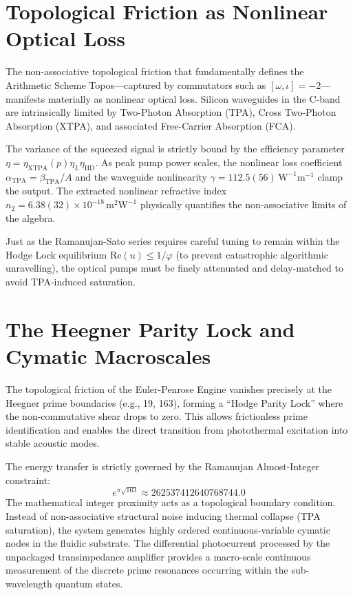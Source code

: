 \section{Topological Friction as Nonlinear Optical Loss}
The non-associative topological friction that fundamentally defines the Arithmetic Scheme Topos---captured by commutators such as $[\omega, \iota] = -2$---manifests materially as nonlinear optical loss. Silicon waveguides in the C-band are intrinsically limited by Two-Photon Absorption (TPA), Cross Two-Photon Absorption (XTPA), and associated Free-Carrier Absorption (FCA).

The variance of the squeezed signal is strictly bound by the efficiency parameter $\eta = \eta_{\mathrm{XTPA}}(p)\eta_L \eta_{\mathrm{HD}}$. As peak pump power scales, the nonlinear loss coefficient $\alpha_{\mathrm{TPA}} = \beta_{\mathrm{TPA}}/A$ and the waveguide nonlinearity $\gamma = 112.5(56)\,\mathrm{W}^{-1}\mathrm{m}^{-1}$ clamp the output. The extracted nonlinear refractive index $n_2 = 6.38(32) \times 10^{-18}\,\mathrm{m}^2\mathrm{W}^{-1}$ physically quantifies the non-associative limits of the algebra. 

Just as the Ramanujan-Sato series requires careful tuning to remain within the Hodge Lock equilibrium $\mathrm{Re}(u) \le 1/\varphi$ (to prevent catastrophic algorithmic unravelling), the optical pumps must be finely attenuated and delay-matched to avoid TPA-induced saturation.

\section{The Heegner Parity Lock and Cymatic Macroscales}
The topological friction of the Euler-Penrose Engine vanishes precisely at the Heegner prime boundaries (e.g., 19, 163), forming a ``Hodge Parity Lock'' where the non-commutative shear drops to zero. This allows frictionless prime identification and enables the direct transition from photothermal excitation into stable acoustic modes. 

The energy transfer is strictly governed by the Ramanujan Almost-Integer constraint:
\begin{equation}
    e^{\pi\sqrt{163}} \approx 262537412640768744.0
\end{equation}
The mathematical integer proximity acts as a topological boundary condition. Instead of non-associative structural noise inducing thermal collapse (TPA saturation), the system generates highly ordered continuous-variable cymatic nodes in the fluidic substrate. The differential photocurrent processed by the unpackaged transimpedance amplifier provides a macro-scale continuous measurement of the discrete prime resonances occurring within the sub-wavelength quantum states.

